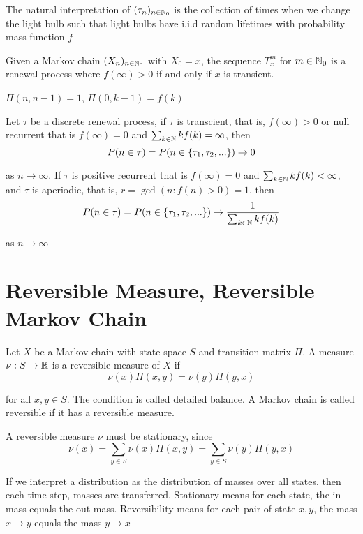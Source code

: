 \documentclass{report}
\begin{document}
\begin{remark}
    The natural interpretation of $(\tau_n)_{n \in \mathbb{N}_0}$ is the collection of times when we change the light bulb such that light bulbs have i.i.d random lifetimes with probability mass function $f$
\end{remark}

\begin{remark}
    Given a Markov chain $(X_n)_{n \in \mathbb{N}_0}$ with $X_0 = x$, the sequence $T_x^m$ for $m \in \mathbb{N}_0$ is a renewal process where $f(\infty) > 0$ if and only if $x$ is transient.
\end{remark}

\begin{remark}
    $\Pi(n, n-1) = 1$, $\Pi(0, k-1) = f(k)$ 
\end{remark}

\begin{theorem}
   Let $\tau$ be a discrete renewal process, if $\tau$ is transcient, that is, $f(\infty) > 0$ or null recurrent that is $f(\infty) = 0$ and $\sum_{k \in \mathbb{N}} k f(k) = \infty$, then
   $$
   		P(n \in \tau) = P(n \in \{\tau_1, \tau_2, ...\}) \to 0
   $$
   
   as $n \to \infty$. If $\tau$ is positive recurrent that is $f(\infty) = 0$ and $\sum_{k \in \mathbb{N}} k f(k) < \infty$, and $\tau$ is aperiodic, that is, $r = \gcd(n: f(n) > 0) = 1$, then
   $$
   		P(n \in \tau) = P(n \in \{\tau_1, \tau_2, ...\}) \to \frac{1}{\sum_{k \in \mathbb{N}} k f(k)}
   $$
   
   as $n \to \infty$
\end{theorem}

\section{Reversible Measure, Reversible Markov Chain}

\begin{definition}
    Let $X$ be a Markov chain with state space $S$ and transition matrix $\Pi$. A measure $\nu: S \to \mathbb{R}$ is a reversible measure of $X$ if
    $$
        \nu(x) \Pi(x, y) = \nu(y) \Pi(y, x)
    $$

    for all $x, y \in S$. The condition is called detailed balance. A Markov chain is called reversible if it has a reversible measure.
\end{definition}

\begin{remark}
    A reversible measure $\nu$ must be stationary, since
    $$
        \nu(x) = \sum_{y \in S} \nu(x) \Pi(x, y) = \sum_{y \in S} \nu(y) \Pi(y, x)
    $$

    If we interpret a distribution as the distribution of masses over all states, then each time step, masses are transferred. Stationary means for each state, the in-mass equals the out-mass. Reversibility means for each pair of state $x, y$, the mass $x \to y$ equals the mass $y \to x$
\end{remark}
\end{document}
